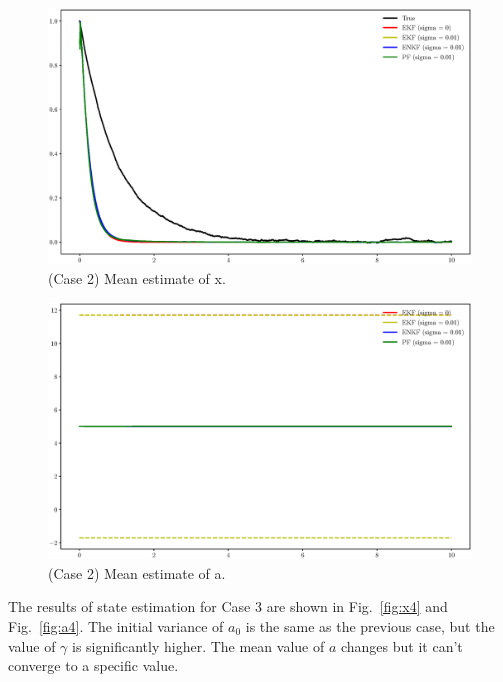 \documentclass[]{elsarticle}
\begin{document}
\begin{figure}[!htb]
\centering
\includegraphics[width=\linewidth,keepaspectratio]{./figs/case00_x_estimate3.eps}
\caption{(Case 2) Mean estimate of x.}
\label{fig:x3}
\end{figure}

\begin{figure}[!htb]
\centering
\includegraphics[width=\linewidth,keepaspectratio]{./figs/case00_a_estimate3.eps}
\caption{(Case 2) Mean estimate of a.}
\label{fig:a3}
\end{figure}


The results of state estimation for Case 3 are shown in Fig.~\ref{fig:x4} and Fig.~\ref{fig:a4}. The initial variance of $a_0$ is the same as the previous case, but the value of $\gamma$ is significantly higher. The mean value of $a$ changes but it can't converge to a specific value. 
\end{document}
